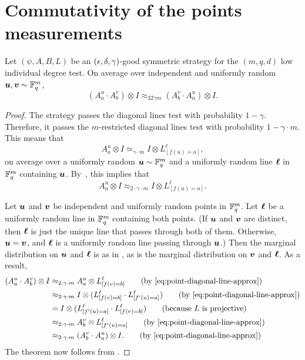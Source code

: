 
\section{Commutativity of the points measurements}
\label{sec:commutativity-points}

\begin{theorem}\label{thm:commutativity-points}
Let $(\psi, A, B, L)$ be an $(\epsilon, \delta, \gamma)$-good symmetric strategy for the
$(m,q,d)$ low individual degree test.
On average over independent and uniformly random $\boldsymbol{u}, \boldsymbol{v} \sim \mathbb F_q^m$,
\begin{equation*}
(A^{u}_a \cdot A^{v}_b) \otimes I \approx_{32\gamma m} (A^{v}_b\cdot A^{u}_a) \otimes I.
\end{equation*}
\end{theorem}
\begin{proof}
The strategy passes the diagonal lines test with probability $1-\gamma$.
Therefore, it passes the $m$-restricted diagonal lines test with probability $1- \gamma\cdot m$.
This means that
\begin{equation*}
A^{u}_a \otimes I \simeq_{\gamma \cdot m} I \otimes L^{\ell}_{[f(u)=a]},
\end{equation*}
on average over a uniformly random $\boldsymbol{u} \sim \mathbb F_q^{m}$ and a uniformly random line $\boldsymbol{\ell}$ in $\mathbb F_q^m$
containing $\boldsymbol{u}$.
By~, this implies that
\begin{equation}\label{eq:point-diagonal-line-approx}
A^{u}_a \otimes I \approx_{2\cdot \gamma \cdot m} I \otimes L^{\ell}_{[f(u)=a]}. 
\end{equation}

Let $\boldsymbol{u}$ and $\boldsymbol{v}$ be independent and uniformly random points in $\mathbb F_q^m$.
Let $\boldsymbol{\ell}$ be a uniformly random line in $\mathbb F_q^m$ containing both points.
(If $\boldsymbol{u}$ and $\boldsymbol{v}$ are distinct, then $\boldsymbol{\ell}$ is just the unique line that passes through both of them.
Otherwise, $\boldsymbol{u} = \boldsymbol{v}$, and $\boldsymbol{\ell}$ is a uniformly random line passing through $\boldsymbol{u}$.)
Then the marginal distribution on $\boldsymbol{u}$ and $\boldsymbol{\ell}$ is as in ,
as is the marginal distribution on $\boldsymbol{v}$ and $\boldsymbol{\ell}$.
As a result,
\begin{align*}
(A^{u}_a \cdot A^{v}_b) \otimes I
&\approx_{2\cdot \gamma \cdot m} A^{u}_a \otimes L^{\ell}_{[f(v)=b]} \tag{by \Cref{eq:point-diagonal-line-approx}}\\
&\approx_{2\cdot \gamma \cdot m} I \otimes (L^{\ell}_{[f(v)=b]} \cdot L^{\ell}_{[f'(u)=a]}) \tag{by \Cref{eq:point-diagonal-line-approx}}\\
&= I \otimes (L^{\ell}_{[f'(u)=a]} \cdot L^{\ell}_{[f(v)=b]}) \tag{because~$L$ is projective}\\
&\approx_{2\cdot \gamma \cdot m} A^{v}_b \otimes L^{\ell}_{[f'(u)=a]} \tag{by \Cref{eq:point-diagonal-line-approx}}\\
&\approx_{2\cdot \gamma \cdot m} (A^{v}_b \cdot A^{u}_a) \otimes I. \tag{by \Cref{eq:point-diagonal-line-approx}}
\end{align*}
The theorem now follows from
.
\end{proof}

